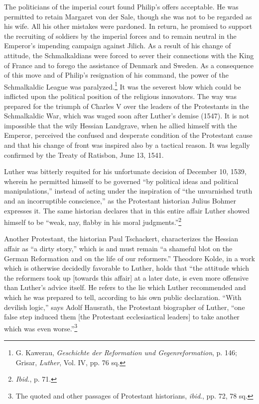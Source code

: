 The politicians of the imperial court found Philip’s offers acceptable.
He was permitted to retain Margaret von der Sale, though she
was not to be regarded as his wife. All his other mistakes were pardoned.
In return, he promised to support the recruiting of soldiers
by the imperial forces and to remain neutral in the Emperor’s impending
campaign against Jilich. As a result of his change of attitude, the
Schmalkaldians were forced to sever their connections with the King
of France and to forego the assistance of Denmark and Sweden. As a
consequence of this move and of Philip’s resignation of his command,
the power of the Schmalkaldic League was paralyzed.\footnote
{G. Kawerau, \textit{Geschichte der Reformation und Gegenreformation}, p. 146; Grisar, \textit{Luther},
Vol. IV, pp. 76 sq.}
It was the
severest blow which could be inflicted upon the political position of
the religious innovators. The way was prepared for the triumph of
Charles V over the leaders of the Protestants in the Schmalkaldic War,
which was waged soon after Luther’s demise (1547). It is not impossible
that the wily Hessian Landgrave, when he allied himself with
the Emperor, perceived the confused and desperate condition of the
Protestant cause and that his change of front was inspired also by a
tactical reason. It was legally confirmed by the Treaty of Ratisbon,
June 13, 1541.

Luther was bitterly requited for his unfortunate decision of December
10, 1539, wherein he permitted himself to be governed “by political
ideas and political manipulations,” instead of acting under the
inspiration of “the unvarnished truth and an incorruptible conscience,”
as the Protestant historian Julius Bohmer expresses it. The
same historian declares that in this entire affair Luther showed himself
to be “weak, nay, flabby in his moral judgments.”\footnote{\textit{Ibid.}, p. 71.}

Another Protestant, the historian Paul Tschackert, characterizes
the Hessian affair as “a dirty story,” which is and must remain “a
shameful blot on the German Reformation and on the life of our
reformers.” Theodore Kolde, in a work which is otherwise decidedly
favorable to Luther, holds that “the attitude which the reformers
took up [towards this affair] at a later date, is even more offensive
than Luther’s advice itself. He refers to the lie which Luther recommended
and which he was prepared to tell, according to his own
public declaration. “With devilish logic,” says Adolf Hausrath, the
Protestant biographer of Luther, “one false step induced them [the
Protestant ecclesiastical leaders] to take another which was even
worse.”\footnote{The quoted and other passages of Protestant historians, \textit{ibid}., pp. 72, 78 sq.}

